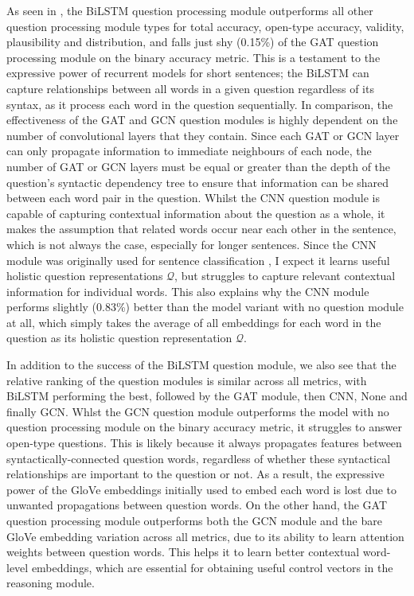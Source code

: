 As seen in \tableautorefname{ \ref{table:question_ablation_main}}, the BiLSTM question processing module outperforms all other question processing module types for total accuracy, open-type accuracy, validity, plausibility and distribution, and falls just shy (0.15\%) of the GAT question processing module on the binary accuracy metric. This is a testament to the expressive power of recurrent models for short sentences; the BiLSTM can capture relationships between all words in a given question regardless of its syntax, as it process each word in the question sequentially. In comparison, the effectiveness of the GAT and GCN question modules is highly dependent on the number of convolutional layers that they contain. Since each GAT or GCN layer can only propagate information to immediate neighbours of each node, the number of GAT or GCN layers must be equal or greater than the depth of the question's syntactic dependency tree to ensure that information can be shared between each word pair in the question. Whilst the CNN question module is capable of capturing contextual information about the question as a whole, it makes the assumption that related words occur near each other in the sentence, which is not always the case, especially for longer sentences. Since the CNN module was originally used for sentence classification \cite{kim2014convolutional}, I expect it learns useful holistic question representations \(\mathcal{Q}\), but struggles to capture relevant contextual information for individual words. This also explains why the CNN module performs slightly (0.83\%) better than the model variant with no question module at all, which simply takes the average of all embeddings for each word in the question as its holistic question representation \(\mathcal{Q}\).

In addition to the success of the BiLSTM question module, we also see that the relative ranking of the question modules is similar across all metrics, with BiLSTM performing the best, followed by the GAT module, then CNN, None and finally GCN. Whlst the GCN question module outperforms the model with no question processing module on the binary accuracy metric, it struggles to answer open-type questions. This is likely because it always propagates features between syntactically-connected question words, regardless of whether these syntactical relationships are important to the question or not. As a result, the expressive power of the GloVe embeddings initially used to embed each word is lost due to unwanted propagations between question words. On the other hand, the GAT question processing module outperforms both the GCN module and the bare GloVe embedding variation across all metrics, due to its ability to learn attention weights between question words. This helps it to learn better contextual word-level embeddings, which are essential for obtaining useful control vectors in the reasoning module.

